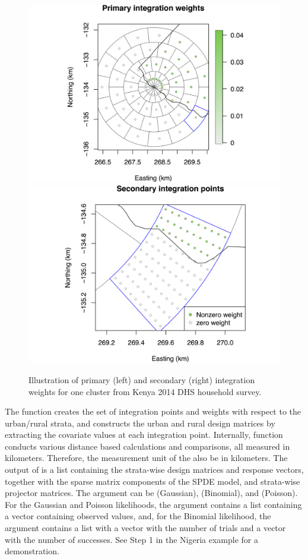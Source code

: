 \begin{figure}
\centering
\includegraphics[width=.49\textwidth]{intPtIllustration.png} \includegraphics[width=.49\textwidth]{subIntPtIllustration2.png}
\caption{Illustration of primary (left) and secondary (right) integration weights for one cluster from Kenya 2014 DHS household survey.}
\label{fig:intPtIllustration}
\end{figure}

 The function  creates the set of integration points and weights with respect to the urban/rural strata, and constructs the urban and rural design matrices by extracting the covariate values at each integration point. Internally,  function conducts various distance based calculations and comparisons, all measured in kilometers. Therefore, the measurement unit of the   also be in kilometers.
The output of  is a list containing the strata-wise design matrices and response vectors, together with the sparse matrix components of the SPDE model, and strata-wise projector matrices.  The argument  can be  (Gaussian),  (Binomial), and  (Poisson). For the Gaussian and Poisson likelihoods, the argument  contains a list containing a vector  containing observed values, and, for the Binomial likelihood, the argument  contains a list with a vector  with the number of trials and a vector  with the number of successes. See Step 1 in the Nigeria example for a demonstration.

